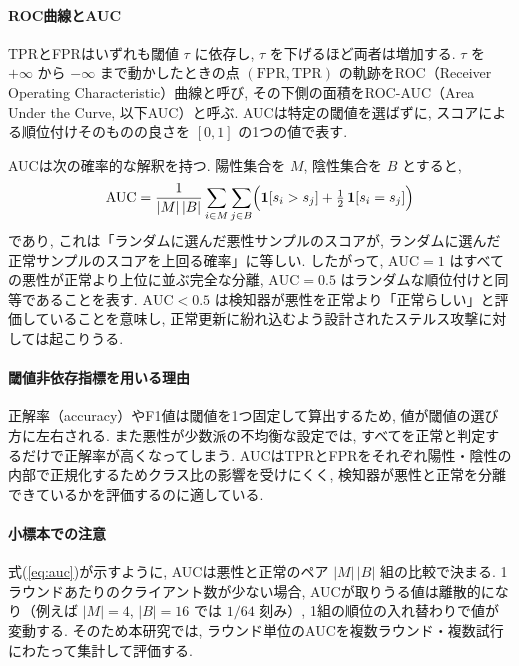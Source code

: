 \documentclass[a4j, twocolumn, dvipdfmx]{jsarticle}
\begin{document}
\paragraph{ROC曲線とAUC}
TPRとFPRはいずれも閾値 $\tau$ に依存し, $\tau$ を下げるほど両者は増加する. $\tau$ を $+\infty$ から $-\infty$ まで動かしたときの点 $(\mathrm{FPR}, \mathrm{TPR})$ の軌跡をROC（Receiver Operating Characteristic）曲線と呼び, その下側の面積をROC-AUC（Area Under the Curve, 以下AUC）と呼ぶ\cite{fawcett2006roc}. AUCは特定の閾値を選ばずに, スコアによる順位付けそのものの良さを $[0,1]$ の1つの値で表す.

AUCは次の確率的な解釈を持つ\cite{hanley1982meaning}. 陽性集合を $M$, 陰性集合を $B$ とすると,
\begin{equation}
\mathrm{AUC}
= \frac{1}{|M|\,|B|}\sum_{i \in M}\sum_{j \in B}
\Bigl( \mathbf{1}[s_i > s_j] + \tfrac{1}{2}\,\mathbf{1}[s_i = s_j] \Bigr)
\label{eq:auc}
\end{equation}
であり, これは「ランダムに選んだ悪性サンプルのスコアが, ランダムに選んだ正常サンプルのスコアを上回る確率」に等しい. したがって, $\mathrm{AUC}=1$ はすべての悪性が正常より上位に並ぶ完全な分離, $\mathrm{AUC}=0.5$ はランダムな順位付けと同等であることを表す. $\mathrm{AUC}<0.5$ は検知器が悪性を正常より「正常らしい」と評価していることを意味し, 正常更新に紛れ込むよう設計されたステルス攻撃に対しては起こりうる.

\paragraph{閾値非依存指標を用いる理由}
正解率（accuracy）やF1値は閾値を1つ固定して算出するため, 値が閾値の選び方に左右される. また悪性が少数派の不均衡な設定では, すべてを正常と判定するだけで正解率が高くなってしまう. AUCはTPRとFPRをそれぞれ陽性・陰性の内部で正規化するためクラス比の影響を受けにくく, 検知器が悪性と正常を分離できているかを評価するのに適している.

\paragraph{小標本での注意}
式(\ref{eq:auc})が示すように, AUCは悪性と正常のペア $|M|\,|B|$ 組の比較で決まる. 1ラウンドあたりのクライアント数が少ない場合, AUCが取りうる値は離散的になり（例えば $|M|=4$, $|B|=16$ では $1/64$ 刻み）, 1組の順位の入れ替わりで値が変動する. そのため本研究では, ラウンド単位のAUCを複数ラウンド・複数試行にわたって集計して評価する.

\end{document}
